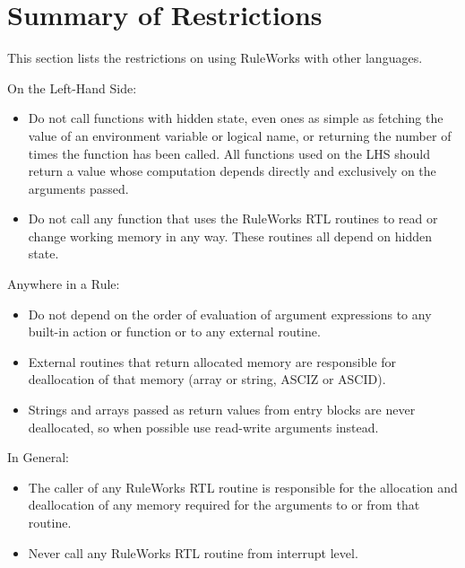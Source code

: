 \section{Summary of Restrictions}

This section lists the restrictions on using RuleWorks with other
languages.

On the Left-Hand Side:

\begin{itemize}
\item Do not call functions with hidden state, even ones as simple as
  fetching the value of an environment variable or logical name, or
  returning the number of times the function has been called. All
  functions used on the LHS should return a value whose computation
  depends directly and exclusively on the arguments passed.
\item Do not call any function that uses the RuleWorks RTL routines to
  read or change working memory in any way. These routines all depend
  on hidden state.
\end{itemize}

Anywhere in a Rule:

\begin{itemize}
\item Do not depend on the order of evaluation of argument expressions
  to any built-in action or function or to any external routine.
\item External routines that return allocated memory are responsible
  for deallocation of that memory (array or string, ASCIZ or ASCID).
\item Strings and arrays passed as return values from entry blocks are
  never deallocated, so when possible use read-write arguments
  instead.
\end{itemize}

In General:

\begin{itemize}             
\item The caller of any RuleWorks RTL routine is responsible for the
  allocation and deallocation of any memory required for the arguments
  to or from that routine.
\item Never call any RuleWorks RTL routine from interrupt level.
\end{itemize}

